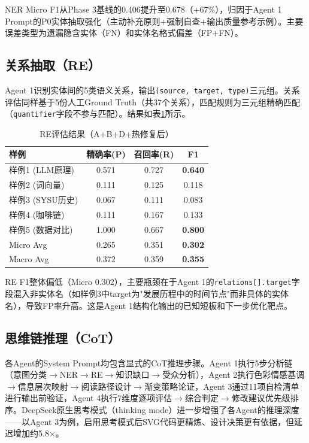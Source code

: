 \documentclass[11pt,a4paper]{article}
\begin{document}
NER Micro F1从Phase 3基线的0.406提升至0.678（+67\%），归因于Agent 1 Prompt的P0实体抽取强化（主动补充原则+强制自查+输出质量参考示例）。主要误差类型为遗漏隐含实体（FN）和实体名格式偏差（FP+FN）。

\subsection{关系抽取（RE）}

Agent 1识别实体间的5类语义关系，输出\texttt{(source, target, type)}三元组。关系评估同样基于5份人工Ground Truth（共37个关系），匹配规则为三元组精确匹配（\texttt{quantifier}字段不参与匹配）。结果如表\ref{tab:re}所示。

\begin{table}[H]
\centering
\caption{RE评估结果（A+B+D+热修复后）}
\label{tab:re}
\begin{tabular}{lccc}
\toprule
样例 & 精确率(P) & 召回率(R) & F1 \\
\midrule
样例1 (LLM原理) & 0.571 & 0.727 & \textbf{0.640} \\
样例2 (词向量) & 0.111 & 0.125 & 0.118 \\
样例3 (SYSU历史) & 0.067 & 0.111 & 0.083 \\
样例4 (咖啡链) & 0.111 & 0.167 & 0.133 \\
样例5 (数据对比) & 1.000 & 0.667 & \textbf{0.800} \\
\midrule
Micro Avg & 0.265 & 0.351 & \textbf{0.302} \\
Macro Avg & 0.372 & 0.359 & \textbf{0.355} \\
\bottomrule
\end{tabular}
\end{table}

RE F1整体偏低（Micro 0.302），主要瓶颈在于Agent 1的\texttt{relations[].target}字段混入非实体名（如样例3中target为"发展历程中的时间节点"而非具体的实体名），导致FP率升高。这是Agent 1结构化输出的已知短板和下一步优化靶点。

\subsection{思维链推理（CoT）}

各Agent的System Prompt均包含显式的CoT推理步骤。Agent 1执行5步分析链（意图分类$\rightarrow$NER$\rightarrow$RE$\rightarrow$知识缺口$\rightarrow$受众分析），Agent 2执行色彩情感基调$\rightarrow$信息层次映射$\rightarrow$阅读路径设计$\rightarrow$渐变策略论证，Agent 3通过11项自检清单进行输出前验证，Agent 4执行7维度逐项评估$\rightarrow$综合判定$\rightarrow$修改建议优先级排序。DeepSeek原生思考模式（thinking mode）进一步增强了各Agent的推理深度——以Agent 3为例，启用思考模式后SVG代码更精炼、设计决策更有依据，但延迟增加约5.8$\times$。
\end{document}
